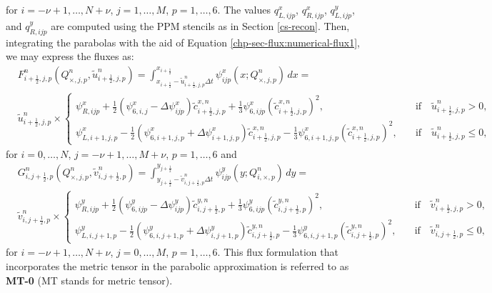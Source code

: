 for $i=-\nu+1, \ldots, N + \nu$, $j=1, \ldots, M$, $p=1,\ldots,6$.
The values $q_{L,ijp}^x$, $q_{R,ijp}^x$, $q_{L,ijp}^y$, and $q_{R,ijp}^y$ are computed using the PPM stencils
as in Section \ref{cs-recon}. Then, integrating the parabolas with the aid of Equation \eqref{chp-sec-flux:numerical-flux1},
 we may express the fluxes as:
\begin{align}
	\label{chp5-flux-xdir}
	&F_{i+\frac{1}{2},j,p}^n ({Q^n_{\times,j,p},\tilde{u}^n_{i+\frac{1}{2},j,p}}) = 
	\int_{x_{i+\frac{1}{2}}-\tilde{u}_{i+\frac{1}{2},j,p}^n\Delta t}^{x_{i+\frac{1}{2}}}
	{\psi_{ijp}^x(x;Q_{\times, j,p}^n) \,dx} =\\ 
	&\tilde{u}^{n}_{i+\frac{1}{2},j,p} \times
	\begin{cases}
		\psi_{R,ijp}^x +\frac{1}{2}(\psi_{6,i,j}^x - \Delta \psi_{ijp}^x){\tilde{c}_{i+\frac{1}{2},j,p}^{x,n}}
		+\frac{1}{3}{\psi_{6,ijp}^x}(\tilde{c}_{i+\frac{1}{2},j,p}^{x,n})^2,
		\quad &\text{if} \quad \tilde{u}_{i+\frac{1}{2},j,p}^n>0,\\ \nonumber
		\psi_{L,i+1,j,p}^x - \frac{1}{2}(\psi_{6,i+1,j,p}^x + \Delta \psi_{i+1,j,p}^x){\tilde{c}_{i+\frac{1}{2},j,p}^{x,n}}
		-\frac{1}{3}{\psi_{6,i+1,j,p}^x}(\tilde{c}_{i+\frac{1}{2},j,p}^{x,n})^2,
		\quad &\text{if} \quad \tilde{u}_{i+\frac{1}{2},j,p}^n\leq0,\nonumber
	\end{cases}
\end{align}
for $i=0, \ldots, N$, $j=-\nu+1, \ldots, M + \nu$, $p=1,\ldots,6$ and 
\begin{align}
	\label{chp5-flux-ydir}
	&G_{i,j+\frac{1}{2},p}^n ({Q^n_{\times,j,p},\tilde{v}^n_{i,j+\frac{1}{2},p}}) =
	\int_{y_{j+\frac{1}{2}}-\tilde{v}_{i,j+\frac{1}{2},p}^n\Delta t}^{y_{j+\frac{1}{2}}}
	{\psi_{ijp}^y(y;Q_{i,\times, p}^n) \,dy} = \\
	&\tilde{v}^n_{i,j+\frac{1}{2},p}\times
	\begin{cases}
		\psi_{R,ijp}^y +\frac{1}{2}(\psi_{6,ijp}^y - \Delta \psi_{ijp}^y){\tilde{c}_{i,j+\frac{1}{2},p}^{y,n}}
		+\frac{1}{3}{\psi_{6,ijp}^y}(\tilde{c}_{i,j+\frac{1}{2},p}^{y,n})^2,
		\quad &\text{if} \quad \tilde{v}_{i+\frac{1}{2},j,p}^n>0,\\ \nonumber
		\psi_{L,i,j+1,p}^y - \frac{1}{2}(\psi_{6,i,j+1,p}^y + \Delta \psi_{i,j+1,p}^y){\tilde{c}_{i,j+\frac{1}{2},p}^{y,n}}
		-\frac{1}{3}{\psi_{6,i,j+1,p}^y}(\tilde{c}_{i,j+\frac{1}{2},p}^{y,n})^2,
		\quad &\text{if} \quad \tilde{v}_{i,j+\frac{1}{2},p}^n\leq0,\nonumber
	\end{cases}
\end{align}
for $i=-\nu+1, \ldots, N + \nu$, $j=0, \ldots, M$, $p=1,\ldots,6$.
This flux formulation that incorporates the metric tensor in the parabolic approximation
is referred to as \textbf{MT-0} (MT stands for metric tensor).

